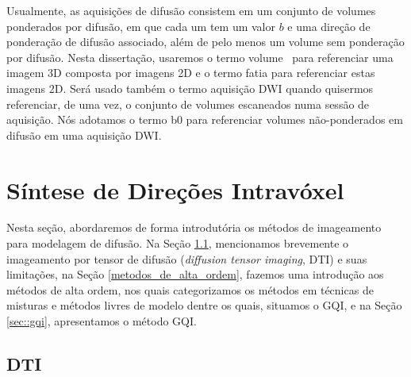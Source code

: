 \documentclass[
    12pt,                %
    oneside,            %
    a4paper,            %
    english,            %
    french,                %
    spanish,            %
    brazil                %
    ]{abntex2}
\begin{document}

Usualmente, as aquisições de difusão consistem em um conjunto de volumes ponderados por difusão, em que cada um tem um valor $b$ e uma direção de ponderação de difusão associado, além de pelo menos um volume sem ponderação por difusão. Nesta dissertação, usaremos o termo \textsf{volume} ~para referenciar uma imagem 3D composta por imagens 2D e o termo \textsf{fatia} para referenciar estas imagens 2D. Será usado também o termo \textsf{aquisição DWI} quando quisermos referenciar, de uma vez, o conjunto de volumes escaneados numa sessão de aquisição. Nós adotamos o termo \textsf{b0}  para referenciar volumes não-ponderados em difusão em uma aquisição DWI.

\section{Síntese de Direções Intravóxel}
\label{sec:sintese_intravoxels}

Nesta seção, abordaremos de forma introdutória os métodos de imageamento para modelagem de difusão. Na Seção \ref{sec::dti_limitacoes_hardi}, mencionamos brevemente o imageamento por tensor de difusão (\textit{diffusion tensor imaging}, DTI) e suas limitações, na Seção \ref{metodos_de_alta_ordem}, fazemos uma introdução aos métodos de alta ordem, nos quais categorizamos os métodos em técnicas de misturas e métodos livres de modelo dentre os quais, situamos o GQI, e na Seção \ref{sec::gqi}, apresentamos o método GQI.

\subsection{DTI}
\label{sec::dti_limitacoes_hardi}
\end{document}
